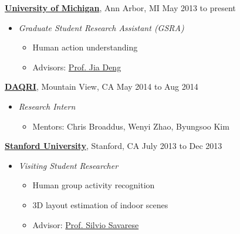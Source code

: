 \documentclass[10pt]{article}
\newenvironment{innerlist}[1][\enskip\textbullet]%
        {\begin{itemize}[#1,leftmargin=*,parsep=0pt,itemsep=0pt,topsep=0pt,partopsep=0pt]}
        {\end{itemize}}
\begin{document}
\href{http://www.umich.edu}{\textbf{University of Michigan}}, Ann Arbor, MI \hfill {May 2013 to present} \\
\vspace{-.15in}
\begin{innerlist}
\item[] \emph{Graduate Student Research Assistant (GSRA)} \\
    \vspace{-.15in}
    \begin{innerlist}
    \item Human action understanding
    \item Advisors: \href{http://http://web.eecs.umich.edu/~jiadeng/}{Prof. Jia Deng}
    \end{innerlist}
\end{innerlist}
\vspace{.1in}
\href{http://daqri.com/}{\textbf{DAQRI}}, Mountain View, CA \hfill {May 2014 to Aug 2014} \\
\vspace{-.15in}
\begin{innerlist}
\item[] \emph{Research Intern} \\
    \vspace{-.15in}
    \begin{innerlist}
    \item Mentors: Chris Broaddus, Wenyi Zhao, Byungsoo Kim
    \end{innerlist}
\end{innerlist}
\vspace{.1in}
\href{http://www.stanford.edu}{\textbf{Stanford University}}, Stanford, CA \hfill {July 2013 to Dec 2013} \\
\vspace{-.15in}
\begin{innerlist}
\item[] \emph{Visiting Student Researcher} \\
    \vspace{-.15in}
    \begin{innerlist}
    \item Human group activity recognition
    \item 3D layout estimation of indoor scenes
    \item Advisor: \href{http://cvgl.stanford.edu/silvio/}{Prof. Silvio Savarese}
    \end{innerlist}
\end{innerlist}
\end{document}
